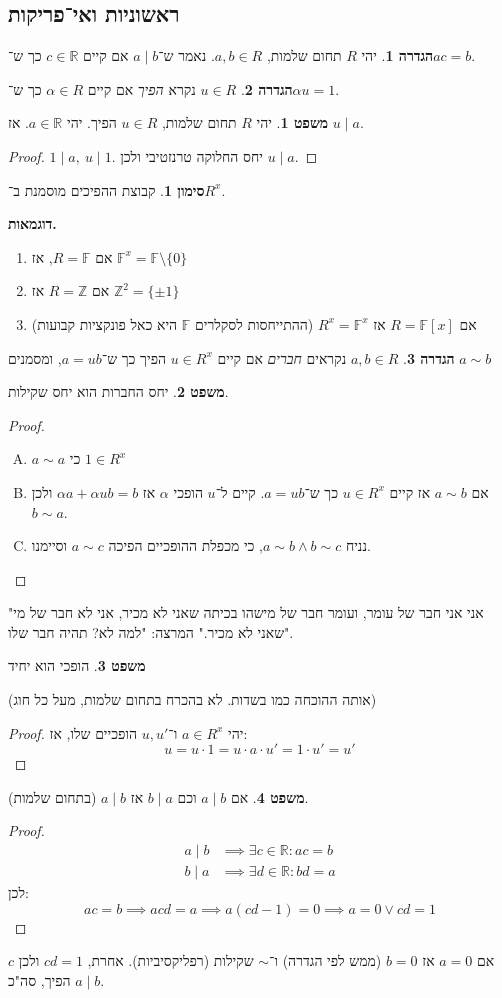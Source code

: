 \documentclass[a4paper]{article}
\newcommand\Z     {\mathbb{Z}}
\newcommand\R     {\mathbb{R}}
\newcommand\F         {\mathbb{F}}
\newcommand\co        {\colon}
\newcommand\ag        {\alpha}
\theoremstyle{definition}
\newtheorem{Theorem}{משפט}
\newtheorem{definition}{הגדרה}
\newtheorem{Notion}{סימון}
\newcommand\theo  [1] {\begin{Theorem}#1\end{Theorem}}
\newcommand\defi  [1] {\begin{definition}#1\end{definition}}
\newcommand\noti  [1] {\begin{Notion}#1\end{Notion}}
\begin{document}
	\subsection{ראשוניות ואי־פריקות}
	\defi{יהי $R$ תחום שלמות, $a, b \in R$. נאמר ש־$a \mid b$ אם קיים $c \in \R$ כך ש־$ac = b$. }
	\defi{$u \in R$ נקרא \textit{הפיך} אם קיים $\ag \in R$ כך ש־$\ag u = 1$. }
	\theo{יהי $R$ תחום שלמות, $u \in R$ הפיך. יהי $a \in \R$. אז $u \mid a$. }\begin{proof}
		$1 \mid a, \ u \mid 1$. יחס החלוקה טרנזטיבי ולכן $u \mid a$. 
	\end{proof}
	\noti{קבוצת ההפיכים מוסמנת ב־$R^x$. }
	\textbf{דוגמאות. }
	\begin{enumerate}
		\item אם $R = \F$, אז $\F^x = \F \setminus \{0\}$
		\item אם $R = \Z$ אז $\Z^2 = \{\pm 1\}$
		\item אם $R = \F[x]$ אז $R^x = \F^x$ (ההתייחסות לסקלרים $\F$ היא כאל פונקציות קבועות)
	\end{enumerate}
	\defi{$a, b \in R$ נקראים \textit{חברים} אם קיים $u \in R^x$ הפיך כך ש־$a = ub$, ומסמנים $a \sim b$ }
	
	\theo{יחס החברות הוא יחס שקילות. }
	\begin{proof}\,
		\begin{enumerate}[A.]
			\item $a \sim a$ כי $1 \in R^x$
			\item אם $a \sim b$ אז קיים $u \in R^x$ כך ש־$a = ub$. קיים ל־$u$ הופכי $\ag$ אז $\ag a + \ag u b = b$ ולכן $b \sim a$. 
			\item נניח $a \sim b \land b \sim c$, כי מכפלת ההופכיים הפיכה $a \sim c$ וסיימנו. 
		\end{enumerate}
	\end{proof}
	"אני אני חבר של עומר, ועומר חבר של מישהו בכיתה שאני לא מכיר, אני לא חבר של מי שאני לא מכיר." המרצה: "למה לא? תהיה חבר שלו". 
	
	
	\theo{הופכי הוא יחיד} (אותה ההוכחה כמו בשדות. לא בהכרח בתחום שלמות, מעל כל חוג)\begin{proof}
		יהי $a \in R^x$ ו־$u, u'$ הופכיים שלו, אז:
		\[ u = u \cdot 1 = u \cdot a \cdot u' = 1 \cdot u' = u' \]
	\end{proof}
	\theo{אם $a \mid b$ וכם $b \mid a$ אז $a \mid b$ (בתחום שלמות). }\begin{proof}
		\begin{align*}
			a \mid b &\implies \exists c \in \R \co ac = b \\
			b \mid a &\implies \exists d \in \R\co bd = a
		\end{align*}
		לכן: 
		\[ ac = b \implies acd = a \implies a(cd - 1) = 0 \implies a = 0 \lor cd = 1 \]
	\end{proof}
	אם $a = 0$ אז $b = 0$ (ממש לפי הגדרה) ו־$\sim$ שקילות (רפליקסיביות). אחרת, $cd = 1$ ולכן $c$ הפיך, סה"כ $a \mid b$. 
	
\end{document}
